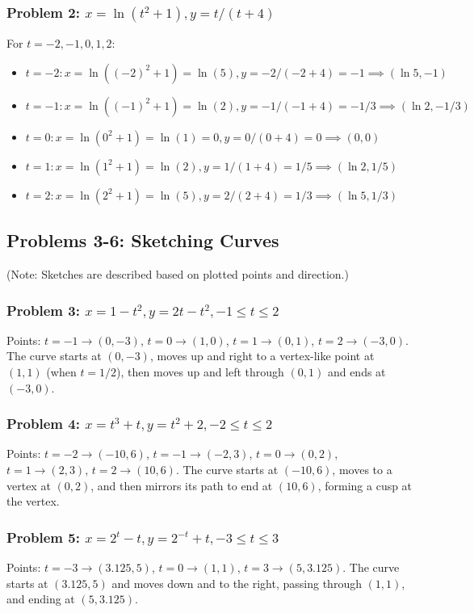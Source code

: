 \documentclass{article}
\begin{document}
\subsubsection{Problem 2: \(x = \ln(t^2 + 1), y = t/(t+4)\)}
For \(t = -2, -1, 0, 1, 2\):
\begin{itemize}
    \item \(t=-2: x=\ln((-2)^2+1)=\ln(5), y=-2/(-2+4)=-1 \implies (\ln 5, -1)\)
    \item \(t=-1: x=\ln((-1)^2+1)=\ln(2), y=-1/(-1+4)=-1/3 \implies (\ln 2, -1/3)\)
    \item \(t=0: x=\ln(0^2+1)=\ln(1)=0, y=0/(0+4)=0 \implies (0, 0)\)
    \item \(t=1: x=\ln(1^2+1)=\ln(2), y=1/(1+4)=1/5 \implies (\ln 2, 1/5)\)
    \item \(t=2: x=\ln(2^2+1)=\ln(5), y=2/(2+4)=1/3 \implies (\ln 5, 1/3)\)
\end{itemize}

\subsection{Problems 3-6: Sketching Curves}
(Note: Sketches are described based on plotted points and direction.)

\subsubsection{Problem 3: \(x = 1 - t^2, y = 2t - t^2, -1 \le t \le 2\)}
Points: \(t=-1 \to (0, -3)\), \(t=0 \to (1, 0)\), \(t=1 \to (0, 1)\), \(t=2 \to (-3, 0)\).
The curve starts at \((0, -3)\), moves up and right to a vertex-like point at \((1,1)\) (when \(t=1/2\)), then moves up and left through \((0,1)\) and ends at \((-3,0)\).

\subsubsection{Problem 4: \(x = t^3 + t, y = t^2 + 2, -2 \le t \le 2\)}
Points: \(t=-2 \to (-10, 6)\), \(t=-1 \to (-2, 3)\), \(t=0 \to (0, 2)\), \(t=1 \to (2, 3)\), \(t=2 \to (10, 6)\).
The curve starts at \((-10, 6)\), moves to a vertex at \((0, 2)\), and then mirrors its path to end at \((10, 6)\), forming a cusp at the vertex.

\subsubsection{Problem 5: \(x = 2^t - t, y = 2^{-t} + t, -3 \le t \le 3\)}
Points: \(t=-3 \to (3.125, 5)\), \(t=0 \to (1, 1)\), \(t=3 \to (5, 3.125)\).
The curve starts at \((3.125, 5)\) and moves down and to the right, passing through \((1,1)\), and ending at \((5, 3.125)\).
\end{document}
